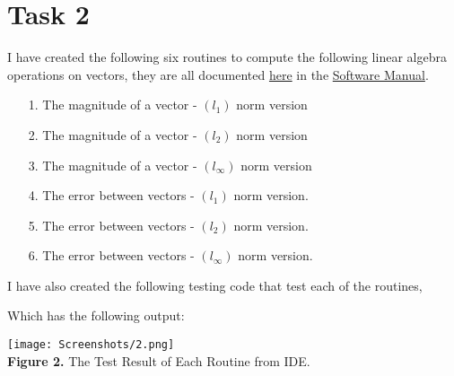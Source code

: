 \documentclass{article}
\begin{document}
\section*{Task 2}
I have created the following six routines to compute the following linear algebra operations on vectors, they are all documented \href{https://github.com/GoByMark/math4610/blob/main/Homework_Tasks/Tasksheet_09/src/Task_2.py}{here} in the \href{https://github.com/GoByMark/math4610/blob/main/Homework_Tasks/Software_Manual/Software_Manual_toc.md}{Software Manual}.\\
\begin{enumerate}
\item[1.] The magnitude of a vector - $\left(l_1\right)$ norm version\\

\item[2.] The magnitude of a vector - $\left(l_2\right)$ norm version\\

\item[3.] The magnitude of a vector - $\left(l_\infty\right)$ norm version\\

\item[4.] The error between vectors - $\left(l_1\right)$ norm version.\\

\item[5.] The error between vectors - $\left(l_2\right)$ norm version.\\

\item[6.] The error between vectors - $\left(l_\infty\right)$ norm version.\\

\end{enumerate}
I have also created the following testing code that test each of the routines, 



Which has the following output:
\begin{center}
\texttt{[image: Screenshots/2.png]}\\
{\bf Figure 2.} The Test Result of Each Routine from IDE.
\end{center}
\end{document}
